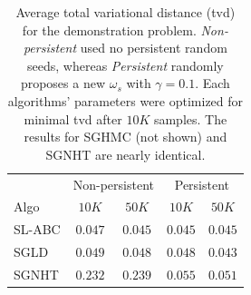 \documentclass[]{article}
\begin{document}
\begin{table}[h]
  \vspace{-0.1in}
\caption{Average total variational distance (tvd) for the demonstration problem.  {\em Non-persistent} used no persistent random seeds, whereas {\em Persistent} randomly proposes a new $\omega_s$ with $\gamma=0.1$. Each algorithms' parameters were optimized for minimal tvd after $10K$ samples.  The results for SGHMC (not shown) and SGNHT are nearly identical.  
}
\label{tab:exp-posterior}
\begin{center}
\begin{tabular}{l|c|c||c|c|}
  \cline{2-5}
 & \multicolumn{2}{|c||}{Non-persistent} & \multicolumn{2}{c|}{Persistent} \\
 \cline{1-5} 
\multicolumn{1}{|l|}{Algo} & $10K$ & $50K$ & $10K$ & $50K$ \\ \hline \hline 
\multicolumn{1}{|l|}{SL-ABC} & $0.047$ & $0.045$ & $0.045$ & $0.045$ \\
\multicolumn{1}{|l|}{SGLD} & $0.049$ & $0.048$ & $0.048$ & $0.043$ \\
\multicolumn{1}{|l|}{SGNHT} & $0.232$ & $0.239$ & $0.055$ & $0.051$ \\\hline 
\end{tabular}
\end{center}
\end{table}
\vspace{-0.2in}
\end{document}
